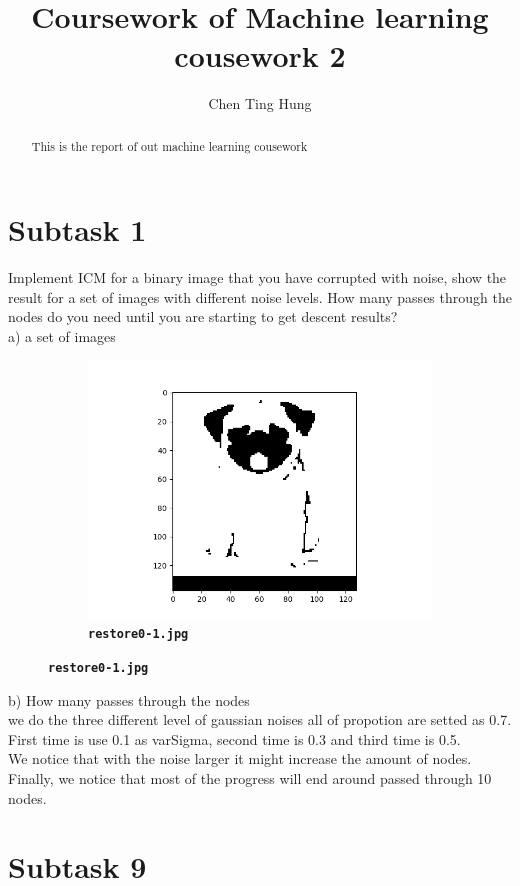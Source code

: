 \documentclass[12pt]{article}
\begin{document}
\title{Coursework of Machine learning cousework 2}



\author{Chen Ting Hung} {}
	
\maketitle

\begin{abstract}
This is the report of out machine learning cousework
\end{abstract}

\section{Subtask 1}
Implement ICM for a binary image that you have corrupted with noise, show the result for a set of images with different noise levels. How many passes through the nodes do you need until you are starting to get descent results?\\

a) a set of images\\
\begin{figure}[htb]
\centering
\begin{subfigure}[b]{.48\linewidth}
  \centering
  \includegraphics[width=\linewidth]{result/restore0-1.png}
  \caption{\textbf{\texttt{restore0-1.jpg}}}
\end{subfigure}
\label{fig:1}
\end{figure}

b) How many passes through the nodes\\
we do the three different level of gaussian noises all of propotion are setted as 0.7.\\ 
First time is use 0.1 as varSigma, second time is 0.3 and third time is 0.5.\\
We notice that with the noise larger it might increase the amount of nodes.\\
Finally, we notice that most of the progress will end around passed through 10 nodes.\\

\section{Subtask 9}
\end{document}
